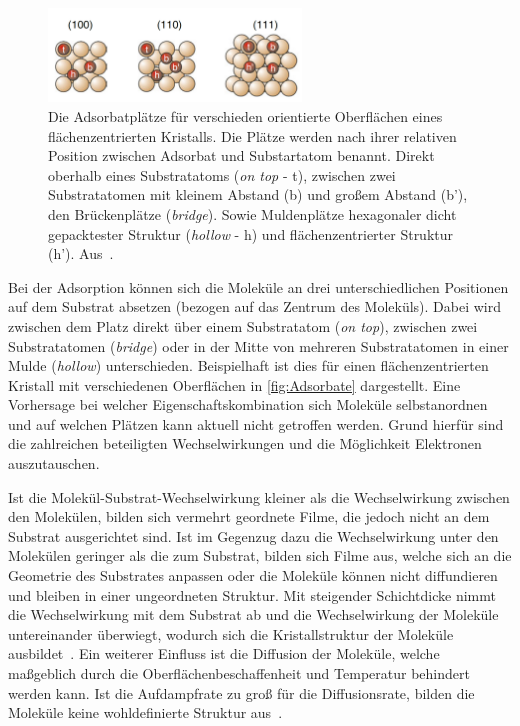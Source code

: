             \begin{figure}
                \centering
                \includegraphics[width=0.6\textwidth]{Adsorbate}
                \caption{Die Adsorbatplätze für verschieden orientierte Oberflächen eines flächenzentrierten Kristalls.
                Die Plätze werden nach ihrer relativen Position zwischen Adsorbat und Substartatom benannt.
                Direkt oberhalb eines Substratatoms (\textit{on top} - t), zwischen zwei Substratatomen mit kleinem Abstand (b) und großem Abstand (b'), den Brückenplätze (\textit{bridge}).
                Sowie Muldenplätze hexagonaler dicht gepacktester Struktur (\textit{hollow} - h) und flächenzentrierter Struktur (h'). Aus~\cite{Fauster}.}
                \label{fig:Adsorbate}
            \end{figure}
            Bei der Adsorption können sich die Moleküle an drei unterschiedlichen Positionen auf dem Substrat absetzen (bezogen auf das Zentrum des Moleküls).
            Dabei wird zwischen dem Platz direkt über einem Substratatom (\textit{on top}), zwischen zwei Substratatomen (\textit{bridge}) oder in der Mitte von mehreren Substratatomen in einer Mulde (\textit{hollow}) unterschieden.
            Beispielhaft ist dies für einen flächenzentrierten Kristall mit verschiedenen Oberflächen in \autoref{fig:Adsorbate} dargestellt.
            Eine Vorhersage bei welcher Eigenschaftskombination sich Moleküle selbstanordnen und auf welchen Plätzen kann aktuell nicht getroffen werden.
            Grund hierfür sind die zahlreichen beteiligten Wechselwirkungen und die Möglichkeit Elektronen auszutauschen. 

            Ist die Molekül-Substrat-Wechselwirkung kleiner als die Wechselwirkung zwischen den Molekülen, bilden sich vermehrt geordnete Filme, die jedoch nicht an dem Substrat ausgerichtet sind.
            Ist im Gegenzug dazu die Wechselwirkung unter den Molekülen geringer als die zum Substrat, bilden sich Filme aus, welche sich an die Geometrie des Substrates anpassen oder die Moleküle können nicht diffundieren und bleiben in einer ungeordneten Struktur.
            Mit steigender Schichtdicke nimmt die Wechselwirkung mit dem Substrat ab und die Wechselwirkung der Moleküle untereinander überwiegt, wodurch sich die Kristallstruktur der Moleküle ausbildet~\cite{5A_9}.
            Ein weiterer Einfluss ist die Diffusion der Moleküle, welche maßgeblich durch die Oberflächenbeschaffenheit und Temperatur behindert werden kann.
            Ist die Aufdampfrate zu groß für die Diffusionsrate, bilden die Moleküle keine wohldefinierte Struktur aus~\cite{IF_15}.

